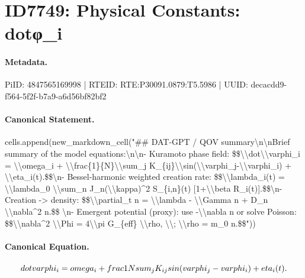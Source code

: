 \section*{ID7749: Physical Constants: dotφ\_i}
\paragraph{Metadata.}
PiID: 4847565169998 | RTEID: RTE:P30091.0879:T5.5986 | UUID: decacdd9-f564-5f2f-b7a9-a6d56bf82bf2

\paragraph{Canonical Statement.}
cells.append(new\_markdown\_cell("\#\# DAT-GPT / QOV summary\textbackslash{}n\textbackslash{}nBrief summary of the model equations:\textbackslash{}n\textbackslash{}n- Kuramoto phase field: \$\$\textbackslash{}\textbackslash{}dot\textbackslash{}\textbackslash{}varphi\_i = \textbackslash{}\textbackslash{}omega\_i + \textbackslash{}\textbackslash{}frac\{1\}\{N\}\textbackslash{}\textbackslash{}sum\_j K\_\{ij\}\textbackslash{}\textbackslash{}sin(\textbackslash{}\textbackslash{}varphi\_j-\textbackslash{}\textbackslash{}varphi\_i) + \textbackslash{}\textbackslash{}eta\_i(t).\$\$\textbackslash{}n- Bessel-harmonic weighted creation rate: \$\$\textbackslash{}\textbackslash{}lambda\_i(t) = \textbackslash{}\textbackslash{}lambda\_0 \textbackslash{}\textbackslash{}sum\_n J\_n(\textbackslash{}\textbackslash{}kappa)\textasciicircum{}2 S\_\{i,n\}(t) [1+\textbackslash{}\textbackslash{}beta R\_i(t)].\$\$\textbackslash{}n- Creation -> density: \$\$\textbackslash{}\textbackslash{}partial\_t n = \textbackslash{}\textbackslash{}lambda - \textbackslash{}\textbackslash{}Gamma n + D\_n \textbackslash{}\textbackslash{}nabla\textasciicircum{}2 n.\$\$ \textbackslash{}n- Emergent potential (proxy): use -\textbackslash{}\textbackslash{}nabla n or solve Poisson: \$\$\textbackslash{}\textbackslash{}nabla\textasciicircum{}2 \textbackslash{}\textbackslash{}Phi = 4\textbackslash{}\textbackslash{}pi G\_\{eff\} \textbackslash{}\textbackslash{}rho, \textbackslash{}\textbackslash{}; \textbackslash{}\textbackslash{}rho = m\_0 n.\$\$"))

\paragraph{Canonical Equation.}
\[
\\dot\\varphi_i = \\omega_i + \\frac{1}{N}\\sum_j K_{ij}\\sin(\\varphi_j-\\varphi_i) + \\eta_i(t).
\]

